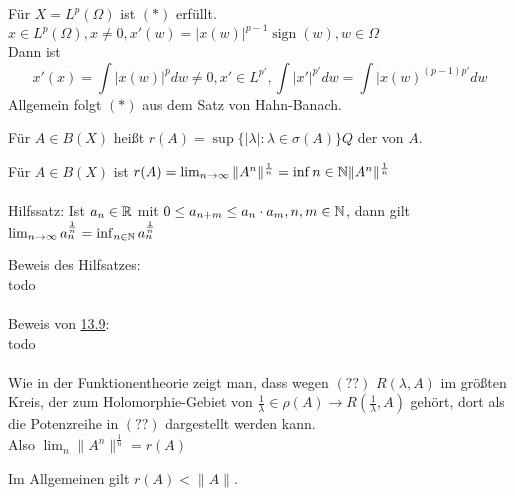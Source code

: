 \begin{bemerkung} \label{bem:13.7}
	Für $X = L^{p}(\Omega)$ ist \hyperref[eq:13.6.5-DualAbbildungAuf0]{$(*)$} erfüllt. $x \in L^{p}(\Omega), x \neq 0, x'(w) = |x(w)|^{p-1} \operatorname{sign}(w), w \in \Omega$ \\
	Dann ist 
	\[ x'(x) = \int | x(w) |^{p} dw \neq 0, x' \in L^{p'}, \int |x'|^{p'} dw = \int |x(w)^{(p-1)p'} dw \]
	Allgemein folgt \hyperref[eq:13.6.5-DualAbbildungAuf0]{$(*)$} aus dem Satz von Hahn-Banach. %
\end{bemerkung}


\begin{definition} \label{def:13.8-Spektralradius}
	Für $A \in B(X)$ hei{\ss}t $r(A) = \sup \{ | \lambda |: \lambda \in \sigma(A) \}Q$ der  von $A$.
\end{definition}


\begin{satz} \label{satz:13.9}
	Für $A \in B(X)$ ist $r(A) = \lim_{n \rightarrow \infty} \| A^{n} \|^{\frac{1}{n}} = \inf{n \in \ensuremath{\mathbb{N}}} \| A^{n} \|^{\frac{1}{n}}$ \\ \\
	Hilfssatz: Ist $a_{n} \in \mathbb{R}$ mit $0 \leq a_{n + m} \leq a_{n} \cdot a_{m}, n,m \in \mathbb{N}$, dann gilt $\lim_{n \rightarrow \infty} a_{n}^{\frac{1}{n}} = \inf_{n \in \mathbb{N}} a_{n}^{\frac{1}{n}}$
\end{satz}

\begin{beweis} %
	Beweis des Hilfsatzes: \\
	todo \\ \\ 
	
	Beweis von \hyperref[satz:13.9]{13.9}: \\
	todo \\ \\ 
	
	Wie in der Funktionentheorie zeigt man, dass wegen \hyperref[]{$(??)$} $R(\lambda, A)$ im grö{\ss}ten Kreis, der zum Holomorphie-Gebiet von $\frac{1}{\lambda} \in \rho(A) \rightarrow R(\frac{1}{\lambda}, A)$ gehört, dort als die Potenzreihe in \hyperref[]{$(??)$} dargestellt werden kann. \\ %
	Also $\lim_{n} \|A^{n} \|^{\frac{1}{n}} = r(A)$
\end{beweis}


Im Allgemeinen gilt $r(A) < \| A \|$.


